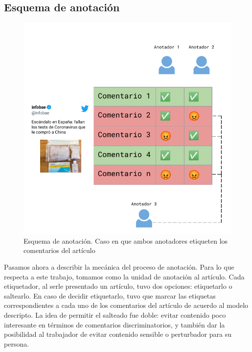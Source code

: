 \subsection{Esquema de anotación}



\begin{figure}
    \centering
    \includegraphics[width=\textwidth]{img/05/esquema_anotacion.pdf}
    \caption{Esquema de anotación. Caso en que ambos anotadores etiqueten los comentarios del artículo}
    \label{fig:annotation_schema}
\end{figure}

Pasamos ahora a describir la mecánica del proceso de anotación. Para lo que respecta a este trabajo, tomamos como la unidad de anotación al artículo. Cada etiquetador, al serle presentado un artículo, tuvo dos opciones: etiquetarlo o saltearlo. En caso de decidir etiquetarlo, tuvo que marcar las etiquetas correspondientes a cada uno de los comentarios del artículo de acuerdo al modelo descripto. La idea de permitir el salteado fue doble: evitar contenido poco interesante en términos de comentarios discriminatorios, y también dar la posibilidad al trabajador de evitar contenido sensible o perturbador para su persona.

